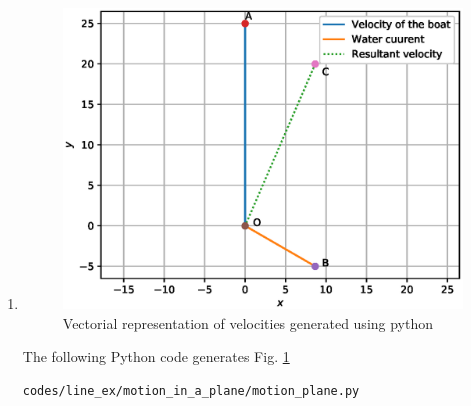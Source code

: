 \begin{enumerate}
\item \begin{figure}[!ht]
\centering
\includegraphics[width=\columnwidth]{./figs/line_ex/motion_in_a_plane/motion_plane.eps}
\caption{Vectorial representation of velocities generated using python}
\label{fig:motion_plane_motion_in_a_plane}
\end{figure} 

The following Python code generates Fig. \ref{fig:motion_plane_motion_in_a_plane}

\begin{lstlisting}
codes/line_ex/motion_in_a_plane/motion_plane.py
\end{lstlisting}

\end{enumerate}
